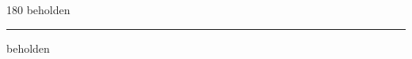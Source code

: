 
\begin{frame}
\begin{center}
\begin{turn}{180}
{\fontsize{2.5cm}{1em}\selectfont beholden}
\end{turn}
\vspace{1em}\par  
\hrule
\vspace{1em}\par  
{\fontsize{2.5cm}{1em}\selectfont beholden}
\end{center}
\end{frame}
